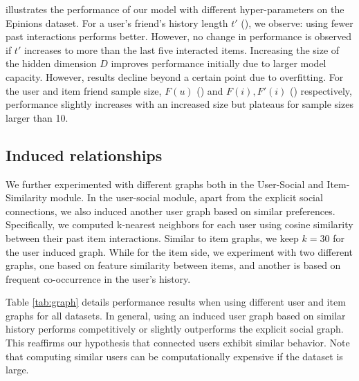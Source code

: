  illustrates the performance of our model with different hyper-parameters on the Epinions dataset. For a user's friend's history length $t'$ (),  we observe: using fewer past interactions performs better. However, no change in performance is observed if $t'$ increases to more than the last five interacted items.
Increasing the size of the hidden dimension $D$ improves performance initially due to larger model capacity. However, results decline beyond a certain point due to overfitting.
For the user and item friend sample size, $F(u)$ () and $F(i), F'(i)$  () respectively, performance slightly increases with an increased size but plateaus for  sample sizes larger than 10.

\subsection{Induced relationships}

We further experimented with different graphs both in the User-Social and Item-Similarity module. In the user-social module, apart from the explicit social connections, we also induced another user graph based on similar preferences. Specifically, we computed k-nearest neighbors for each user using cosine similarity between their past item interactions. Similar to item graphs, we keep $k = 30$ for the user induced graph.
While for the item side, we experiment with two different graphs, one based on feature similarity between items, and another is based on frequent co-occurrence in the user's history.

Table \ref{tab:graph} details performance results when using different user and item graphs for all datasets. In general, using an induced user graph based on similar history performs competitively or slightly outperforms the explicit social graph. This reaffirms our hypothesis that connected users exhibit similar behavior. Note that computing similar users can be computationally expensive if the dataset is large.

